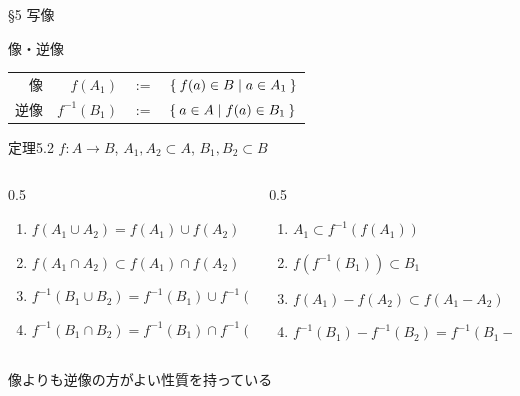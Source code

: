 \documentclass[uplatex,a4paper,dvipdfmx,aspectratio=169,11pt]{beamer}
\begin{document}
\begin{frame}[fragile]{\S 5 写像}
    \begin{block}{像・逆像}
        \begin{tabular}{rrcl} 
            \alert{像} \quad   & $f(A_1)$ & $:= $ & $\Set{ f(a) \in B | a \in A_1}$ \\
            \alert{逆像} \quad & $f^{-1}(B_1)$ & $:= $ & $\Set{ a \in A | f(a) \in B_1}$
        \end{tabular}
    \end{block}
    \medskip

    \begin{block}{定理5.2}
        $f \colon A \to B$, \quad $A_1, A_2 \subset A$, \quad $B_1, B_2 \subset B$
        \begin{columns}
            \begin{column}{0.5\linewidth}
                \begin{enumerate}[(1)]
                    \item $f(A_1 \cup A_2) = f(A_1) \cup f(A_2)$
                    \item \alert{$f(A_1 \cap A_2) \subset f(A_1) \cap f(A_2)$}
                    \item $f^{-1}(B_1 \cup B_2) = f^{-1}(B_1) \cup f^{-1}(B_2)$
                    \item \alert{$f^{-1}(B_1 \cap B_2) = f^{-1}(B_1) \cap f^{-1}(B_2)$}
                \end{enumerate}
            \end{column}
            \begin{column}{0.5\linewidth}
                \begin{enumerate}
                    \item[(5)] $A_1 \subset f^{-1}(f(A_1))$
                    \item[(6)] $f(f^{-1}(B_1)) \subset B_1$
                    \item[(7)] \alert{$f(A_1) - f(A_2) \subset f(A_1 - A_2)$}
                    \item[(8)] \alert{$f^{-1}(B_1) - f^{-1}(B_2) = f^{-1}(B_1 - B_2)$}
                \end{enumerate}
            \end{column}
        \end{columns}
    \end{block}

    像よりも逆像の方がよい性質を持っている
\end{frame}
\end{document}

